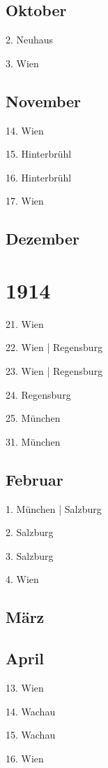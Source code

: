 \documentclass[twoside=false,titlepage=false,open=any, parskip=never, fontsize=10pt, headings=small, chapterprefix=false, appendixprefix=false, DIV=15]{scrbook}
\begin{document}
\begin{multicols}{3}
            \section*{Oktober}
            2. Neuhaus\par
            3. Wien\par
            \section*{November}
            14. Wien\par
            15. Hinterbrühl\par
            16. Hinterbrühl\par
            17. Wien\par
            \section*{Dezember}
            \chapter*{1914}
            21. Wien\par
            22. Wien | Regensburg\par
            23. Wien | Regensburg\par
            24. Regensburg\par
            25. München\par
            31. München\par
            \section*{Februar}
            1. München | Salzburg\par
            2. Salzburg\par
            3. Salzburg\par
            4. Wien\par
            \section*{März}
            \section*{April}
            13. Wien\par
            14. Wachau\par
            15. Wachau\par
            16. Wien\par

\end{multicols}
\end{document}
